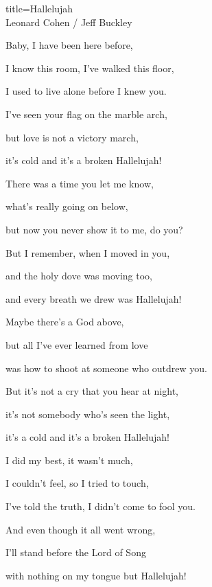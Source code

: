 \begin{song}{title=\centering Hallelujah \\\normalsize Leonard Cohen / Jeff Buckley \vspace*{-0.3cm}}
{\begin{minipage}[t]{0.48\textwidth}
\sloka
	Baby, I have been here before,  
	
	I know this room, I've walked this floor,  
	
	I used to live alone before I knew you.  
	
	I've seen your flag on the marble arch,  
	
	but love is not a victory march,  
	
	it's cold and it's a broken Hallelujah!  


\end{minipage}\begin{minipage}[t]{0.5\textwidth}\setlength{\parindent}{0.45cm}  %
\vspace*{0.445cm}

\sloka
	There was a time you let me know,   
	
	what's really going on below,   
	
	but now you never show it to me, do you?   
	
	But I remember, when I moved in you,   
	
	and the holy dove was moving too,   
	
	and every breath we drew was Hallelujah!   
	

\sloka
	Maybe there's a God above,   
	
	but all I've ever learned from love   
	
	was how to shoot at someone who outdrew you.   
	
	But it's not a cry that you hear at night,   
	
	it's not somebody who's seen the light,   
	
	it's a cold and it's a broken Hallelujah!   
	
\sloka
	I did my best, it wasn't much,   
	
	I couldn't feel, so I tried to touch,   
	
	I've told the truth, I didn't come to fool you.   
	
	And even though it all went wrong,   
	
	I'll stand before the Lord of Song   
	
	with nothing on my tongue but Hallelujah!   
	


\end{minipage}   %
}
\setcounter{Slokočet}{0}
\end{song}

